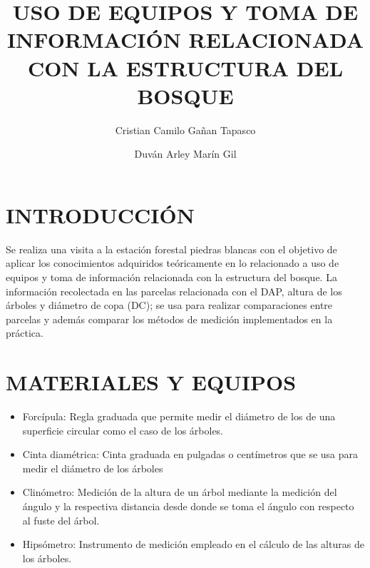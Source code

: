 \documentclass[letterpaper,9pt,twocolumn,twoside,]{pinp}
\title{USO DE EQUIPOS Y TOMA DE INFORMACIÓN RELACIONADA CON LA ESTRUCTURA DEL
BOSQUE}
\author[a]{Cristian Camilo Gañan Tapasco}
\author[a]{Duván Arley Marín Gil}
\affil[a]{Departamento de ciencias forestales, Universidad Nacional de Colombia,
Medellín}
\providecommand{\tightlist}{%
  \setlength{\itemsep}{0pt}\setlength{\parskip}{0pt}}
\begin{document}
\verticaladjustment{-2pt}

\maketitle
\thispagestyle{firststyle}



\hypertarget{introducciuxf3n}{%
\section{INTRODUCCIÓN}\label{introducciuxf3n}}

Se realiza una visita a la estación forestal piedras blancas con el
objetivo de aplicar los conocimientos adquiridos teóricamente en lo
relacionado a uso de equipos y toma de información relacionada con la
estructura del bosque. La información recolectada en las parcelas
relacionada con el DAP, altura de los árboles y diámetro de copa (DC);
se usa para realizar comparaciones entre parcelas y además comparar los
métodos de medición implementados en la práctica.

\hypertarget{materiales-y-equipos}{%
\section{MATERIALES Y EQUIPOS}\label{materiales-y-equipos}}

\begin{itemize}
\tightlist
\item
  Forcípula: Regla graduada que permite medir el diámetro de los de una
  superficie circular como el caso de los árboles.
\item
  Cinta diamétrica: Cinta graduada en pulgadas o centímetros que se usa
  para medir el diámetro de los árboles
\item
  Clinómetro: Medición de la altura de un árbol mediante la medición del
  ángulo y la respectiva distancia desde donde se toma el ángulo con
  respecto al fuste del árbol.
\item
  Hipsómetro: Instrumento de medición empleado en el cálculo de las
  alturas de los árboles.
\end{itemize}
\end{document}
